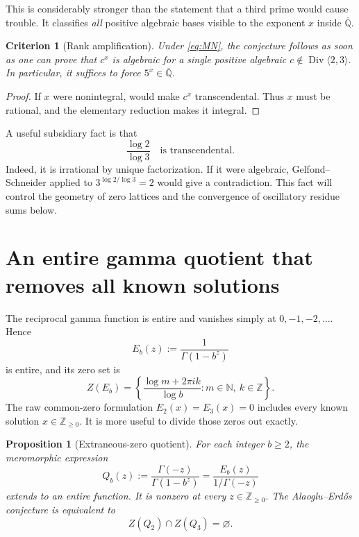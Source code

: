 \documentclass[11pt]{article}
\numberwithin{equation}{section}
\newtheorem{proposition}[theorem]{Proposition}
\newtheorem{criterion}[theorem]{Criterion}
\theoremstyle{definition}
\theoremstyle{remark}
\newcommand{\Z}{\mathbb{Z}}
\newcommand{\N}{\mathbb{N}}
\newcommand{\Qbar}{\overline{\mathbb{Q}}}
\newcommand{\Div}{\operatorname{Div}}
\begin{document}
This is considerably stronger than the statement that a third prime would cause trouble.  It classifies \emph{all} positive algebraic bases visible to the exponent $x$ inside $\Qbar$.

\begin{criterion}[Rank amplification]
\label{crit:rank-amplification}
Under \eqref{eq:MN}, the conjecture follows as soon as one can prove that $c^x$ is algebraic for a single positive algebraic $c\notin\Div\langle2,3\rangle$.  In particular, it suffices to force $5^x\in\Qbar$.
\end{criterion}

\begin{proof}
If $x$ were nonintegral,  would make $c^x$ transcendental.  Thus $x$ must be rational, and the elementary reduction makes it integral.
\end{proof}

A useful subsidiary fact is that
\begin{equation}
  \frac{\log2}{\log3}\quad\text{is transcendental}.
  \label{eq:logratio-trans}
\end{equation}
Indeed, it is irrational by unique factorization.  If it were algebraic, Gelfond--Schneider applied to $3^{\log2/\log3}=2$ would give a contradiction.  This fact will control the geometry of zero lattices and the convergence of oscillatory residue sums below.

\section{An entire gamma quotient that removes all known solutions}
\label{sec:entire-quotient}

The reciprocal gamma function is entire and vanishes simply at $0,-1,-2,\dots$.  Hence
\begin{equation}
 E_b(z):=\frac{1}{\Gamma(1-b^z)}
 \label{eq:Eb}
\end{equation}
is entire, and its zero set is
\begin{equation}
 Z(E_b)=\left\{\frac{\log m+2\pi i k}{\log b}:m\in\N,\ k\in\Z\right\}.
 \label{eq:Ezeros}
\end{equation}
The raw common-zero formulation $E_2(x)=E_3(x)=0$ includes every known solution $x\in\Z_{\ge0}$.  It is more useful to divide those zeros out exactly.

\begin{proposition}[Extraneous-zero quotient]
\label{prop:Qb}
For each integer $b\ge2$, the meromorphic expression
\begin{equation}
 Q_b(z):=\frac{\Gamma(-z)}{\Gamma(1-b^z)}
       =\frac{E_b(z)}{1/\Gamma(-z)}
 \label{eq:Qb}
\end{equation}
extends to an entire function.  It is nonzero at every $z\in\Z_{\ge0}$.  The Alaoglu--Erd\H{o}s conjecture is equivalent to
\begin{equation}
 Z(Q_2)\cap Z(Q_3)=\varnothing.
 \label{eq:Qcoprime}
\end{equation}
\end{proposition}
\end{document}
